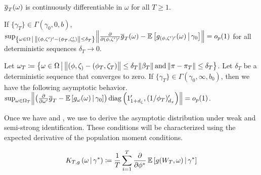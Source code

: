 \documentclass[11pt, letterpaper, twoside, final]{article}
\begin{document}
\begin{appendices}
    
    
    \begin{assump}[GMM 2*]\label{ass:GMM2}
    \begin{assumplist}
        \item $\overline{g}_T(\omega)$ is continuously differentiable in $\omega$ for all $T \geq 1$. 
            \label{ass:GMM2a}
        \item If $\{\gamma_T\} \in \Gamma\left(\gamma_0, 0, b\right)$, $\sup_{\left\lbrace \omega \in \Omega \mvert
            \norm*{(\phi, \zeta')' - (\phi_T, \zeta_0')} \leq \delta_T \right\rbrace}
            \norm*{\frac{\partial}{\partial (\phi, \zeta')'} \sampmom(\omega) - \E\left[\popmom_{(\phi,
            \zeta')'}(\omega) \mvert \gamma_0\right]} = o_p(1)$ for all deterministic sequences  $\delta_T \to 0$.
            \label{ass:GMM2b}
        \item  Let $\omega_T \coloneqq \left\lbrace \omega \in \Omega \mvert \norm*{(\phi, \zeta_) - (\phi_T, \zeta_T)}
            \leq \delta_T \norm*{\beta_T}\, \text{and}\, \norm*{\pi - \pi_T} \leq \delta_T \right\rbrace$.  Let
            $\delta_T$ be a deterministic sequence that converges to zero.  If $\{\gamma_T \} \in
            \Gamma\left(\gamma_0, \infty, b_0\right)$, then we have the following asymptotic behavior.
            $\sup_{\omega \in \Omega_T} \norm*{\left(\frac{\partial}{\partial \omega'} \overline{g}_T -
            \E\left[g_{\omega}(\omega) \mvert \gamma_0\right]\right) \diag\left(1_{1+d_\zeta}',
            (1/\phi_T)_{d_{\pi}}'\right)}  = o_p(1)$. 
            \label{ass:GMM2c}
    \end{assumplist}
    \end{assump}
    
    Once we have  and , we use  to derive the asymptotic
    distribution under weak and semi-strong identification.
    These conditions will be characterized using the expected derivative of the population moment conditions. 
    
    \begin{defn}
        \label{defn:moment_derivative_func}
        \begin{equation}
            K_{T,g}\left(\omega \,\middle\vert\, \gamma^{*}\right) \coloneqq  \frac{1}{T} \sum_{i=1}^T \frac{\partial}{\partial
            \phi^{*}} \operatorname{\mathbb{E}} \left[ g(W_T, \omega) \,\middle\vert\, \gamma^{*} \right]
        \end{equation}
    \end{defn}
    

\end{appendices}
\end{document}
